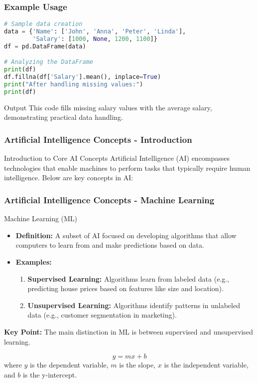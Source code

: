 \documentclass[aspectratio=169]{beamer}
\begin{document}
\begin{frame}[fragile]
    \frametitle{Example Usage}
    \begin{lstlisting}[language=Python]
# Sample data creation
data = {'Name': ['John', 'Anna', 'Peter', 'Linda'],
        'Salary': [1000, None, 1200, 1100]}
df = pd.DataFrame(data)

# Analyzing the DataFrame
print(df)
df.fillna(df['Salary'].mean(), inplace=True)
print("After handling missing values:")
print(df)
    \end{lstlisting}
    \begin{block}{Output}
        This code fills missing salary values with the average salary, demonstrating practical data handling.
    \end{block}
\end{frame}

\begin{frame}[fragile]
    \frametitle{Artificial Intelligence Concepts - Introduction}
    \begin{block}{Introduction to Core AI Concepts}
        Artificial Intelligence (AI) encompasses technologies that enable machines to perform tasks that typically require human intelligence. Below are key concepts in AI:
    \end{block}
\end{frame}

\begin{frame}[fragile]
    \frametitle{Artificial Intelligence Concepts - Machine Learning}
    \begin{block}{Machine Learning (ML)}
        \begin{itemize}
            \item \textbf{Definition:} A subset of AI focused on developing algorithms that allow computers to learn from and make predictions based on data.
            \item \textbf{Examples:}
            \begin{enumerate}
                \item \textbf{Supervised Learning:} Algorithms learn from labeled data (e.g., predicting house prices based on features like size and location).
                \item \textbf{Unsupervised Learning:} Algorithms identify patterns in unlabeled data (e.g., customer segmentation in marketing).
            \end{enumerate}
        \end{itemize}
        
        \textbf{Key Point:} The main distinction in ML is between supervised and unsupervised learning.
        
        \begin{equation}
            y = mx + b 
        \end{equation}
        where \(y\) is the dependent variable, \(m\) is the slope, \(x\) is the independent variable, and \(b\) is the y-intercept.
    \end{block}
\end{frame}
\end{document}
